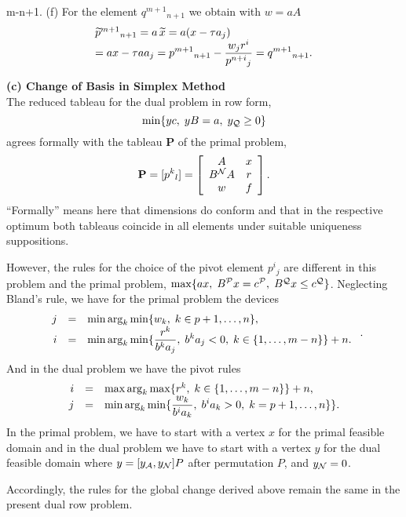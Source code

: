 \neq m-n+1.
 \eeqn
%
(f) For the element $q^{m+1}{}_{n+1}$ we obtain with $w = aA$
%
\[ \ba{.}{l}
\wi{p}^{m+1}{}_{n+1} = a \, \wi{x} = a(x - \tau a_j)\\
\dis = ax - \tau aa_j
= p^{m+1}{}_{n+1} - \frac {w_jr^i}{p^{n+i}{}_j} = q^{m+1}{}_{n+1}.
\ea{.}
\]
\par
{\bf (c) Change of Basis in Simplex Method}\\
The reduced tableau for the dual problem in row form,
\[
\min \{yc, \; yB = a, \; y_{\Q} \geq 0\}
\]
agrees formally with the tableau {\bf P} of the primal problem,
\[
{\bf P} = [p^k{}_l] = \ba{[}{ccc}  A   &  x\\
                             B^{\N}A   &  r\\
                             w         & f  \ea{]}.
\]
``Formally'' means here that dimensions do conform and that in the respective
optimum both tableaus coincide in all elements under suitable uniqueness
suppositions.
\par
However, the rules for the choice of the pivot element $p^i{}_j$ are different
in this problem and the primal problem, $\max \{ax, \; B^{\P} x = c^{\P}, \;
B^{\Q}x \leq c^{\Q}\}$.  Neglecting {\sc Bland}'s rule, we have for the primal
problem the devices
\[ \ba{.}{rcl}
j &=& \min\arg_k\min\{w_k, \; k \in {p+1, \ldots, n}\},\\
i &=& \dis \min \arg_k \min\{\frac{r^k}{b^ka_j}, \; b^ka_j < 0, \;
k \in \{1, \ldots,m-n\}\} + n.
\ea{.}.
\]
And in the dual problem we have the pivot rules
\[ \ba{.}{rcl}
i &=& \max \arg_k \max \{ r^k, \; k \in \{1, \ldots, m - n\}\} + n,\\
j &=& \dis \min \arg_k\min \{\frac{w_k}{b^ia_k}, \; b^ia_k > 0, \;
k = p+1, \ldots, n\}\}.
\ea{.}
\]
In the primal problem, we have to start with a vertex $x$ for the primal
feasible domain and in the dual problem we have to start with a vertex
$y$ for the dual feasible domain where $y = [y_{\A},y_{\N}]P$ after
permutation $P$, and $y_{\N} = 0$.
\par
Accordingly, the rules for the global change derived above remain the same
in the present dual row problem.
